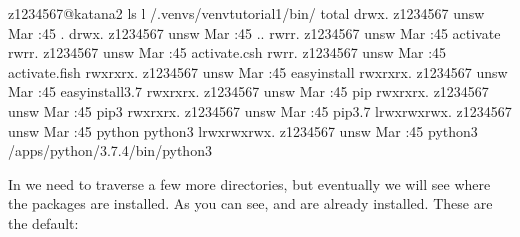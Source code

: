 \documentclass[letterpaper,10pt,english]{sphinxmanual}
\begin{document}
\begin{sphinxVerbatim}[commandchars=\\\{\}]
\PYG{o}{[}z1234567@katana2 \PYGZti{}\PYG{o}{]}\PYGZdl{} ls \PYGZhy{}l \PYGZti{}/.venvs/venv\PYGZhy{}tutorial\PYGZhy{}1/bin/
total 
drwx\PYGZhy{}\PYGZhy{}\PYGZhy{}\PYGZhy{}\PYGZhy{}\PYGZhy{}.  z1234567 unsw  Mar  :45 .
drwx\PYGZhy{}\PYGZhy{}\PYGZhy{}\PYGZhy{}\PYGZhy{}\PYGZhy{}.  z1234567 unsw    Mar  :45 ..
\PYGZhy{}rw\PYGZhy{}r\PYGZhy{}\PYGZhy{}r\PYGZhy{}\PYGZhy{}.  z1234567 unsw  Mar  :45 activate
\PYGZhy{}rw\PYGZhy{}r\PYGZhy{}\PYGZhy{}r\PYGZhy{}\PYGZhy{}.  z1234567 unsw  Mar  :45 activate.csh
\PYGZhy{}rw\PYGZhy{}r\PYGZhy{}\PYGZhy{}r\PYGZhy{}\PYGZhy{}.  z1234567 unsw  Mar  :45 activate.fish
\PYGZhy{}rwxr\PYGZhy{}xr\PYGZhy{}x.  z1234567 unsw   Mar  :45 easy\PYGZus{}install
\PYGZhy{}rwxr\PYGZhy{}xr\PYGZhy{}x.  z1234567 unsw   Mar  :45 easy\PYGZus{}install\PYGZhy{}3.7
\PYGZhy{}rwxr\PYGZhy{}xr\PYGZhy{}x.  z1234567 unsw   Mar  :45 pip
\PYGZhy{}rwxr\PYGZhy{}xr\PYGZhy{}x.  z1234567 unsw   Mar  :45 pip3
\PYGZhy{}rwxr\PYGZhy{}xr\PYGZhy{}x.  z1234567 unsw   Mar  :45 pip3.7
lrwxrwxrwx.  z1234567 unsw     Mar  :45 python \PYGZhy{}\PYGZgt{} python3
lrwxrwxrwx.  z1234567 unsw    Mar  :45 python3 \PYGZhy{}\PYGZgt{} /apps/python/3.7.4/bin/python3
\end{sphinxVerbatim}

In  we need to traverse a few more directories, but eventually we will see where the packages are installed. As you can see,  and  are already installed. These are the default:
\end{document}
